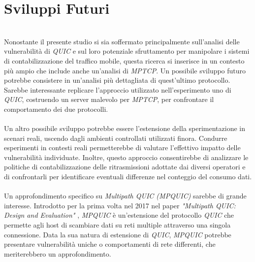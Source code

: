 \section{Sviluppi Futuri}
~\\
\indent Nonostante il presente studio si sia soffermato principalmente sull'analisi delle vulnerabilità di \emph{QUIC} e sul loro potenziale sfruttamento per manipolare i sistemi di contabilizzazione del traffico mobile, questa ricerca si inserisce in un contesto più ampio che include anche un'analisi di \emph{MPTCP}.
Un possibile sviluppo futuro potrebbe consistere in un'analisi più dettagliata di quest'ultimo protocollo.
Sarebbe interessante replicare l'approccio utilizzato nell'esperimento uno di \emph{QUIC}, costruendo un server malevolo per \emph{MPTCP},
per confrontare il comportamento dei due protocolli.
\\\\
Un altro possibile sviluppo potrebbe essere l'estensione della sperimentazione in scenari reali, uscendo dagli ambienti controllati utilizzati finora. 
Condurre esperimenti in contesti reali permetterebbe di valutare l'effettivo impatto delle vulnerabilità individuate. 
Inoltre, questo approccio consentirebbe di analizzare le politiche di contabilizzazione delle ritrasmissioni adottate dai diversi operatori 
e di confrontarli per identificare eventuali differenze nel conteggio del consumo dati.
\\\\
Un approfondimento specifico su \emph{Multipath QUIC (MPQUIC)} sarebbe di grande interesse. 
Introdotto per la prima volta nel 2017 nel paper \emph{"Multipath QUIC: Design and Evaluation"} \cite{article:mpquic},
\emph{MPQUIC} è un'estensione del protocollo \emph{QUIC} che permette agli host di scambiare dati su reti multiple attraverso una singola connessione.
Data la sua natura di estensione di \emph{QUIC},
\emph{MPQUIC} potrebbe presentare vulnerabilità uniche o comportamenti di rete differenti, che meriterebbero un approfondimento.
